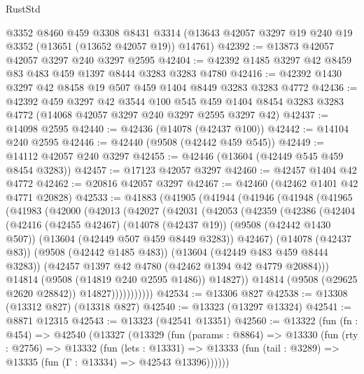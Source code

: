 \begin{lexlean}{RustStd}
\begin{coremodule}
    @3352
    @8460
    @459
    @3308
    @8431
    @3314
    (@13643 @42057 @3297 @19 @240 @19 @3352 (@13651 (@13652 @42057 @19)) @14761)
@42392 := @13873 @42057 @42057 @3297 @240 @3297 @2595
@42404 := @42392 @1485 @3297 @42 @8459 @83 @483 @459 @1397 @8444 @3283 @3283 @4780
@42416 := @42392 @1430 @3297 @42 @8458 @19 @507 @459 @1404 @8449 @3283 @3283 @4772
@42436 := @42392
    @459
    @3297
    @42
    @3544
    @100
    @545
    @459
    @1404
    @8454
    @3283
    @3283
    @4772
    (@14068 @42057 @3297 @240 @3297 @2595 @3297 @42)
@42437 := @14098 @2595
@42440 := @42436 (@14078 (@42437 @100))
@42442 := @14104 @240 @2595
@42446 := @42440 (@9508 (@42442 @459 @545))
@42449 := @14112 @42057 @240 @3297
@42455 := @42446 (@13604 (@42449 @545 @459 @8454 @3283))
@42457 := @17123 @42057 @3297
@42460 := @42457 @1404 @42 @4772
@42462 := @20816 @42057 @3297
@42467 := @42460 (@42462 @1401 @42 @4771 @20828)
@42533 := @41883
    (@41905
      (@41944
        (@41946
          (@41948
            (@41965
              (@41983
                (@42000
                  (@42013
                    (@42027
                      (@42031
                        (@42053
                          (@42359
                            (@42386
                              (@42404
                                (@42416
                                  (@42455 @42467)
                                  (@14078 (@42437 @19))
                                  (@9508 (@42442 @1430 @507))
                                  (@13604 (@42449 @507 @459 @8449 @3283))
                                  @42467)
                                (@14078 (@42437 @83))
                                (@9508 (@42442 @1485 @483))
                                (@13604 (@42449 @483 @459 @8444 @3283))
                                (@42457 @1397 @42 @4780 (@42462 @1394 @42 @4779 @20884)))
                              @14814
                              (@9508 (@14819 @240 @2595 @1486))
                              @14827))
                          @14814
                          (@9508 (@29625 @2620 @28842))
                          @14827)))))))))))
@42534 := @13306 @827
@42538 := @13308 (@13312 @827) (@13318 @827)
@42540 := @13323 (@13297 @13324)
@42541 := @8871 @12315
@42543 := @13323 (@42541 @13351)
@42560 := @13322
    (fun (fn : @454) =>
    @42540
      (@13327
        (@13329
          (fun (params : @8864) =>
          @13330
            (fun (rty : @2756) =>
            @13332
              (fun (lets : @13331) =>
              @13333 (fun (tail : @3289) => @13335 (fun (Γ : @13334) => @42543 @13396))))))

\end{coremodule}
\end{lexlean}
